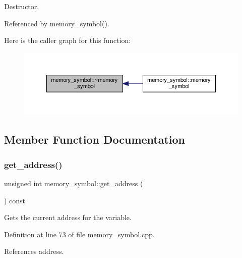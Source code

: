 Destructor. 



Referenced by memory\+\_\+symbol().

Here is the caller graph for this function\+:
\nopagebreak
\begin{figure}[H]
\begin{center}
\leavevmode
\includegraphics[width=350pt]{db/d51/classmemory__symbol_a28f05edf5ec3bea7bb70972dd4fbd265_icgraph}
\end{center}
\end{figure}


\subsection{Member Function Documentation}
\mbox{\label{classmemory__symbol_af3ad921a30142ebbc1c1628f5cdab6a0}} 
\subsubsection{\texorpdfstring{get\+\_\+address()}{get\_address()}}
{\footnotesize\ttfamily unsigned int memory\+\_\+symbol\+::get\+\_\+address (\begin{DoxyParamCaption}{ }\end{DoxyParamCaption}) const}



Gets the current address for the variable. 



Definition at line 73 of file memory\+\_\+symbol.\+cpp.



References address.

\mbox{\label{classmemory__symbol_ac1ec379fc8366abbeea5bebf3c467cfd}} 
